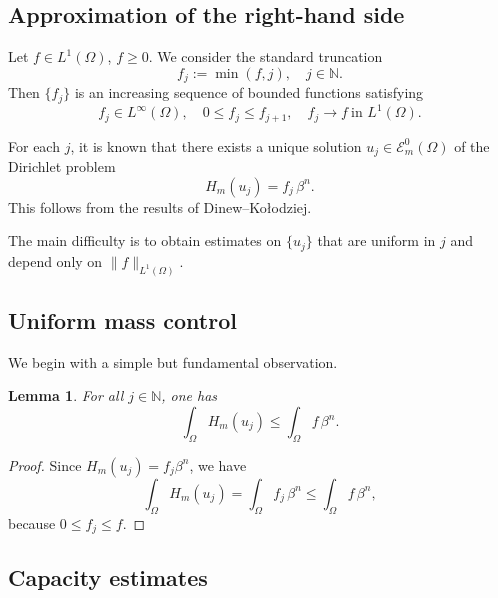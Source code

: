 \documentclass[11pt,reqno]{amsart}
\newtheorem{lemma}[theorem]{Lemma}
\theoremstyle{definition}
\theoremstyle{remark}
\begin{document}
	
	\subsection{Approximation of the right-hand side}
	
	Let $f \in L^1(\Omega)$, $f \ge 0$.
	We consider the standard truncation
	\[
	f_j := \min(f,j), \quad j \in \mathbb{N}.
	\]
	Then $\{f_j\}$ is an increasing sequence of bounded functions satisfying
	\[
	f_j \in L^\infty(\Omega), 
	\quad
	0 \le f_j \le f_{j+1},
	\quad
	f_j \longrightarrow f \ \text{in } L^1(\Omega).
	\]
	
	For each $j$, it is known that there exists a unique solution
	$u_j \in \mathcal{E}_m^0(\Omega)$ of the Dirichlet problem
	\begin{equation}\label{eq:approx}
		H_m(u_j) = f_j \, \beta^n.
	\end{equation}
	This follows from the results of Dinew--Ko\l odziej.
	
	The main difficulty is to obtain estimates on $\{u_j\}$ that are uniform in $j$ and depend only on $\|f\|_{L^1(\Omega)}$.
	
	
	\subsection{Uniform mass control}
	
	We begin with a simple but fundamental observation.
	
	\begin{lemma}\label{lem:mass}
		For all $j \in \mathbb{N}$, one has
		\[
		\int_\Omega H_m(u_j)
		\le \int_\Omega f \, \beta^n.
		\]
	\end{lemma}
	
	\begin{proof}
		Since $H_m(u_j)=f_j\beta^n$, we have
		\[
		\int_\Omega H_m(u_j)
		=
		\int_\Omega f_j \, \beta^n
		\le
		\int_\Omega f \, \beta^n,
		\]
		because $0 \le f_j \le f$.
	\end{proof}
	

	
	
	\subsection{Capacity estimates}
	
\end{document}
